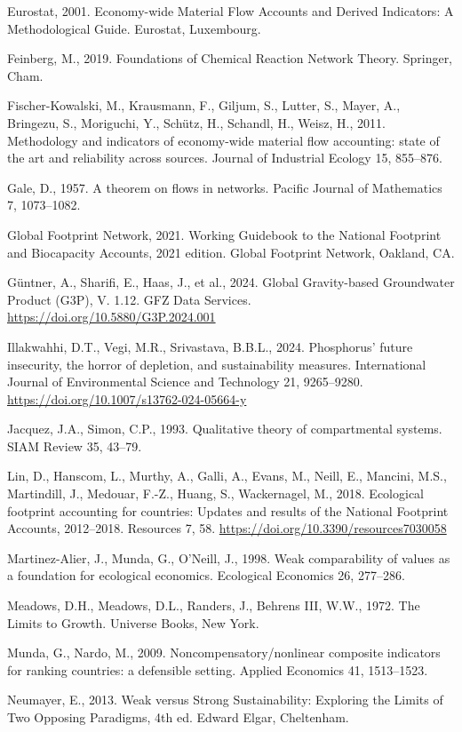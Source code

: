 \documentclass[11pt]{article}
\begin{document}
Eurostat, 2001. Economy-wide Material Flow Accounts and Derived Indicators: A Methodological Guide. Eurostat, Luxembourg.

Feinberg, M., 2019. Foundations of Chemical Reaction Network Theory. Springer, Cham.

Fischer-Kowalski, M., Krausmann, F., Giljum, S., Lutter, S., Mayer, A., Bringezu, S., Moriguchi, Y., Sch\"{u}tz, H., Schandl, H., Weisz, H., 2011. Methodology and indicators of economy-wide material flow accounting: state of the art and reliability across sources. Journal of Industrial Ecology 15, 855--876.

Gale, D., 1957. A theorem on flows in networks. Pacific Journal of Mathematics 7, 1073--1082.

Global Footprint Network, 2021. Working Guidebook to the National Footprint and Biocapacity Accounts, 2021 edition. Global Footprint Network, Oakland, CA.

G\"{u}ntner, A., Sharifi, E., Haas, J., et al., 2024. Global Gravity-based Groundwater Product (G3P), V. 1.12. GFZ Data Services. \url{https://doi.org/10.5880/G3P.2024.001}

Illakwahhi, D.T., Vegi, M.R., Srivastava, B.B.L., 2024. Phosphorus' future insecurity, the horror of depletion, and sustainability measures. International Journal of Environmental Science and Technology 21, 9265--9280. \url{https://doi.org/10.1007/s13762-024-05664-y}

Jacquez, J.A., Simon, C.P., 1993. Qualitative theory of compartmental systems. SIAM Review 35, 43--79.

Lin, D., Hanscom, L., Murthy, A., Galli, A., Evans, M., Neill, E., Mancini, M.S., Martindill, J., Medouar, F.-Z., Huang, S., Wackernagel, M., 2018. Ecological footprint accounting for countries: Updates and results of the National Footprint Accounts, 2012--2018. Resources 7, 58. \url{https://doi.org/10.3390/resources7030058}

Martinez-Alier, J., Munda, G., O'Neill, J., 1998. Weak comparability of values as a foundation for ecological economics. Ecological Economics 26, 277--286.

Meadows, D.H., Meadows, D.L., Randers, J., Behrens III, W.W., 1972. The Limits to Growth. Universe Books, New York.

Munda, G., Nardo, M., 2009. Noncompensatory/\allowbreak{}nonlinear composite indicators for ranking countries: a defensible setting. Applied Economics 41, 1513--1523.

Neumayer, E., 2013. Weak versus Strong Sustainability: Exploring the Limits of Two Opposing Paradigms, 4th ed. Edward Elgar, Cheltenham.
\end{document}
